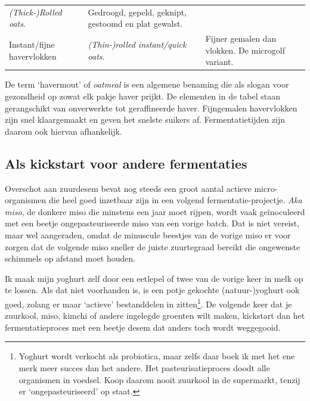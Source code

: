 \documentclass[
  11pt,
  dutch,
]{memoir}
\begin{document}
\begin{longtable}[]{@{}lll@{}}
\begin{minipage}[t]{0.24\columnwidth}
\emph{(Thick-)Rolled oats}.\strut
\end{minipage} & \begin{minipage}[t]{0.37\columnwidth}\raggedright
Gedroogd, gepeld, geknipt, gestoomd en plat gewalst.\strut
\end{minipage}\tabularnewline
\begin{minipage}[t]{0.30\columnwidth}\raggedright
Instant/fijne havervlokken\strut
\end{minipage} & \begin{minipage}[t]{0.24\columnwidth}\raggedright
\emph{(Thin-)rolled instant/quick oats}.\strut
\end{minipage} & \begin{minipage}[t]{0.37\columnwidth}\raggedright
Fijner gemalen dan vlokken. De microgolf variant.\strut
\end{minipage}\tabularnewline
\bottomrule
\end{longtable}

De term `havermout' of \emph{oatmeal} is een algemene benaming die als
slogan voor gezondheid op zowat elk pakje haver prijkt. De elementen in
de tabel staan gerangschikt van onverwerkte tot geraffineerde haver.
Fijngemalen havervlokken zijn snel klaargemaakt en geven het snelste
suikers af. Fermentatietijden zijn daarom ook hiervan afhankelijk.

\hypertarget{als-kickstart-voor-andere-fermentaties}{%
\subsection{Als kickstart voor andere
fermentaties}\label{als-kickstart-voor-andere-fermentaties}}

Overschot aan zuurdesem bevat nog steeds een groot aantal actieve
micro-organismen die heel goed inzetbaar zijn in een volgend
fermentatie-projectje. \emph{Aka miso}, de donkere miso die minstens een
jaar moet rijpen, wordt vaak geïnoculeerd met een beetje
ongepasteuriseerde miso van een vorige batch. Dat is niet vereist, maar
wel aangeraden, omdat de minuscule beestjes van de vorige miso er voor
zorgen dat de volgende miso sneller de juiste zuurtegraad bereikt die
ongewenste schimmels op afstand moet houden.

Ik maak mijn yoghurt zelf door een eetlepel of twee van de vorige keer
in melk op te lossen. Als dat niet voorhanden is, is een potje gekochte
(natuur-)yoghurt ook goed, zolang er maar `actieve' bestanddelen in
zitten\footnote{Yoghurt wordt verkocht als probiotica, maar zelfs daar
  boek ik met het ene merk meer succes dan het andere. Het
  pasteurisatieproces doodt alle organismen in voedsel. Koop daarom
  nooit zuurkool in de supermarkt, tenzij er `ongepasteuriseerd' op
  staat.}. De volgende keer dat je zuurkool, miso, kimchi of andere
ingelegde groenten wilt maken, kickstart dan het fermentatieproces met
een beetje desem dat anders toch wordt weggegooid.
\end{document}
